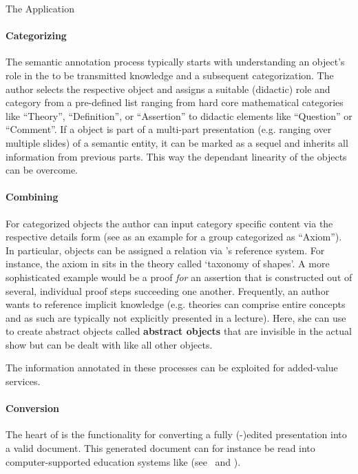 \begin{omgroup}[id=cpoint,short=CPoint,creators=ako]
\begin{omgroup}[id=cpoint.app]{The {\cpoint} Application}
\paragraph{Categorizing}\label{sec:annotationform}
The semantic annotation process typically starts with understanding an object's role in
the to be transmitted knowledge and a subsequent categorization. The author selects the
respective {\ppt} object and assigns a suitable (didactic) role and category from a
pre-defined list ranging from hard core mathematical categories like ``Theory'',
``Definition'', or ``Assertion'' to didactic elements like ``Question'' or ``Comment''. If a {\ppt} object is part of a
multi-part presentation (e.g. ranging over multiple slides) of a semantic entity, it can
be marked as a sequel and inherits all information from previous parts. This way the
{\ppt} dependant linearity of the objects can be overcome.

\paragraph{Combining}\label{sec:detailsform}
For categorized {\ppt} objects the author can input category specific content via the
respective details form (see {} as an example for a {\ppt} group
categorized as ``Axiom''). In particular, {\ppt} objects can be assigned a relation via
{\cpoint}'s reference system. For instance, the axiom in {} sits in the
theory called `taxonomy of shapes'. A more sophisticated example would be a proof
{\emph{for}} an assertion that is constructed out of several, individual proof steps
succeeding one another.  Frequently, an author wants to reference implicit knowledge (e.g.
theories can comprise entire concepts and as such are typically not explicitly presented
in a lecture). Here, she can use {\cpoint} to create abstract {\ppt} objects called {\bf
  abstract objects} that are invisible in the actual {\ppt} show but can be dealt with like all other {\ppt} objects.

\begin{myfig}{Content}{The {\cpoint} Content Form for an Axiom Object}
  \texttt{[image: \\projectsPath\{cpoint/CPointContent]}}
\end{myfig}
The information annotated in these processes can be exploited for added-value services.

\paragraph{{\omdoc} Conversion}\label{sec:omdocize} The heart of {\cpoint} is the
functionality for converting a fully ({\cpoint}-)edited presentation into a valid {\omdoc}
document.  This generated {\omdoc} document can for instance be read into
computer-supported education systems like {\activemath} (see~\cite{activemathAIEDJ01} and
{}).


\end{omgroup}
\end{omgroup}
